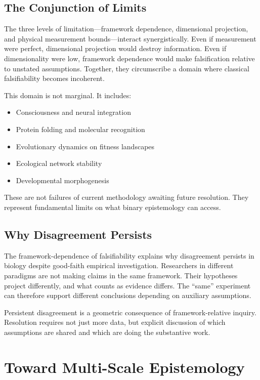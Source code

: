 \documentclass[12pt]{article}
\begin{document}
\subsection{The Conjunction of Limits}

The three levels of limitation---framework dependence, dimensional projection, and physical measurement bounds---interact synergistically. Even if measurement were perfect, dimensional projection would destroy information. Even if dimensionality were low, framework dependence would make falsification relative to unstated assumptions. Together, they circumscribe a domain where classical falsifiability becomes incoherent.

This domain is not marginal. It includes:
\begin{itemize}
\item Consciousness and neural integration
\item Protein folding and molecular recognition
\item Evolutionary dynamics on fitness landscapes
\item Ecological network stability
\item Developmental morphogenesis
\end{itemize}

These are not failures of current methodology awaiting future resolution. They represent fundamental limits on what binary epistemology can access.

\subsection{Why Disagreement Persists}

The framework-dependence of falsifiability explains why disagreement persists in biology despite good-faith empirical investigation. Researchers in different paradigms are not making claims in the same framework. Their hypotheses project differently, and what counts as evidence differs. The ``same'' experiment can therefore support different conclusions depending on auxiliary assumptions.

Persistent disagreement is a geometric consequence of framework-relative inquiry. Resolution requires not just more data, but explicit discussion of which assumptions are shared and which are doing the substantive work.

\section{Toward Multi-Scale Epistemology}
\end{document}
